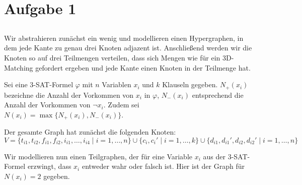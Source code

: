 \documentclass[a4paper]{article}
\begin{document}
\section{Aufgabe 1}
\subsection{}
Wir abstrahieren zunächst ein wenig und modellieren einen Hypergraphen, in
dem jede Kante zu genau drei Knoten adjazent ist. Anschließend werden wir
die Knoten so auf drei Teilmengen verteilen, dass sich Mengen wie für ein
3D-Matching gefordert ergeben und jede Kante einen Knoten in der Teilmenge
hat.

Sei eine 3-SAT-Formel $\varphi$ mit $n$ Variablen $x_i$ und $k$ Klauseln
gegeben. $N_+(x_i)$ bezeichne die Anzahl der Vorkommen von $x_i$ in
$\varphi$, $N_-(x_i)$ entsprechend die Anzahl der Vorkommen von $\neg x_i$.
Zudem sei $N(x_i) = \max\{ N_+(x_i), N_-(x_i) \}$.

Der gesamte Graph hat zunächst die folgenden Knoten:
\[
	V = \{ t_{i1},t_{i2}, f_{i1},f_{i2}, i_{i1},\dots, i_{i4} \mid i = 1,\dots, n\}
	\cup \{ c_i, c_i' \mid i = 1,\dots, k \}
	\cup \{ d_{i1},d_{i1}',d_{i2},d_{i2}' \mid i = 1,\dots, n \}
\]

Wir modellieren nun einen Teilgraphen, der für eine Variable $x_i$ aus
der 3-SAT-Formel erzwingt, dass $x_i$ entweder wahr oder falsch ist.
Hier ist der Graph für $N(x_i) = 2$ gegeben.

\end{document}
